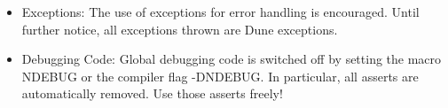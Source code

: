 \begin{itemize}
\begin{itemize}
\item Method Parameters (in / out)
\item Template Parameters
\item Return Values 
\item Exceptions thrown by a method
 \end{itemize}
     Since we all know that writing documentation is not well-liked and is frequently deferred to some vague 
'next week', we herewith proclaim the Doc-Me Dogma. It goes like this: Whatever you do, and in whatever hurry you 
happen to be, please document everything at least with a {\verb /** $\backslash$todo Please doc me! */}. That way at least the absence 
of documentation is documented, and it is easier to get rid of it systematically.
\item Exceptions:
      The use of exceptions for error handling is encouraged. Until further notice, all exceptions thrown are Dune exceptions.
\item Debugging Code:
      Global debugging code is switched off by setting the macro NDEBUG or the compiler flag -DNDEBUG. In particular, all asserts are 
automatically removed. Use those asserts freely!
\end{itemize}
